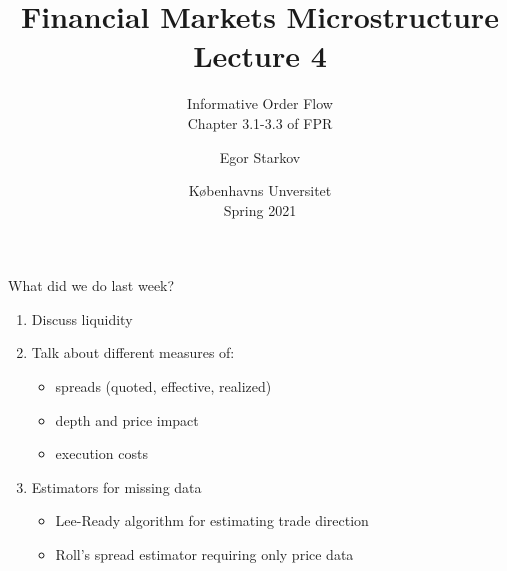 \documentclass[english,10pt
,aspectratio=169
]{beamer}
\title{Financial Markets Microstructure \\ Lecture 4}
\subtitle{Informative Order Flow\\
	Chapter 3.1-3.3 of FPR}
\author{Egor Starkov}
\date{K{\o}benhavns Unversitet \\
	Spring 2021}
\begin{document}
	\frame[plain]{\titlepage}


\begin{frame}{What did we do last week?}
\begin{enumerate}
	\item Discuss liquidity
	\item Talk about different measures of:
	\begin{itemize}
		\item spreads (quoted, effective, realized)
		\item depth and price impact
		\item execution costs
	\end{itemize}
	\item Estimators for missing data
	\begin{itemize}
		\item Lee-Ready algorithm for estimating trade direction
		\item Roll's spread estimator requiring only price data
	\end{itemize}
\end{enumerate}
\end{frame}


\end{document}
